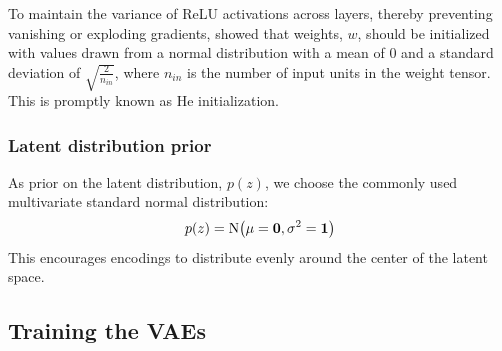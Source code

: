 To maintain the variance of ReLU activations across layers, thereby preventing vanishing or exploding gradients, \cite{ReLu} showed that weights, $w$, should be initialized with values drawn from a normal distribution with a mean of 0 and a standard deviation of $\sqrt{\frac{2}{n_{in}}}$, where $n_{in}$ is the number of input units in the weight tensor. This is promptly known as He initialization.





\subsubsection{Latent distribution prior}

As prior on the latent distribution, $p(z)$, we choose the commonly used multivariate standard normal distribution:
\begin{equation*}
    p(z) = \mathrm{N} \qty(\mu=\bm{0}, \sigma^2=\bm{1})
\end{equation*}
This encourages encodings to distribute evenly around the center of the latent space.

\subsection{Training the VAEs}

